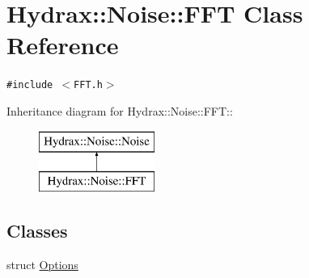 \hypertarget{class_hydrax_1_1_noise_1_1_f_f_t}{
\section{Hydrax::Noise::FFT Class Reference}
\label{class_hydrax_1_1_noise_1_1_f_f_t}
}
{\tt \#include $<$FFT.h$>$}

Inheritance diagram for Hydrax::Noise::FFT::\begin{figure}[H]
\begin{center}
\leavevmode
\includegraphics[height=2cm]{class_hydrax_1_1_noise_1_1_f_f_t}
\end{center}
\end{figure}
\subsection*{Classes}
\begin{CompactItemize}
\item 
struct \hyperlink{struct_hydrax_1_1_noise_1_1_f_f_t_1_1_options}{Options}
\end{CompactItemize}
